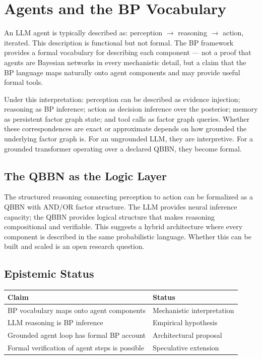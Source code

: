 \section{Agents and the BP Vocabulary}
\label{sec:agents}

An LLM agent is typically described as: perception $\to$ reasoning $\to$
action, iterated. This description is functional but not formal. The BP
framework provides a formal vocabulary for describing each component ---
not a proof that agents are Bayesian networks in every mechanistic detail,
but a claim that the BP language maps naturally onto agent components and
may provide useful formal tools.

Under this interpretation: perception can be described as evidence
injection; reasoning as BP inference; action as decision inference over
the posterior; memory as persistent factor graph state; and tool calls as
factor graph queries. Whether these correspondences are exact or approximate
depends on how grounded the underlying factor graph is. For an ungrounded
LLM, they are interpretive. For a grounded transformer operating over a
declared QBBN, they become formal.

\subsection*{The QBBN as the Logic Layer}

The structured reasoning connecting perception to action can be formalized
as a QBBN with AND/OR factor structure. The LLM provides neural inference
capacity; the QBBN provides logical structure that makes reasoning
compositional and verifiable. This suggests a hybrid architecture where
every component is described in the same probabilistic language. Whether
this can be built and scaled is an open research question.

\subsection*{Epistemic Status}

\begin{center}
\begin{tabular}{ll}
\toprule
Claim & Status \\
\midrule
BP vocabulary maps onto agent components & Mechanistic interpretation \\
LLM reasoning is BP inference & Empirical hypothesis \\
Grounded agent loop has formal BP account & Architectural proposal \\
Formal verification of agent steps is possible & Speculative extension \\
\bottomrule
\end{tabular}
\end{center}